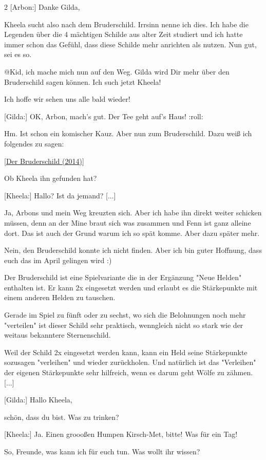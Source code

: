 \documentclass[10pt, a4paper, oneside]{book}
\begin{document}
\begin{multicols}{2}
[Arbon:] Danke Gilda,

Kheela sucht also nach dem Bruderschild. Irrsinn nenne ich dies. Ich habe die Legenden über die 4 mächtigen Schilde aus alter Zeit studiert und ich hatte immer schon das Gefühl, dass diese Schilde mehr anrichten als nutzen. Nun gut, sei es so.

@Kid, ich mache mich nun auf den Weg. Gilda wird Dir mehr über den Bruderschild sagen können. Ich such jetzt Kheela!

Ich hoffe wir sehen uns alle bald wieder!

[Gilda:] OK, Arbon, mach's gut. Der Tee geht auf's Haus! :roll:

Hm. Ist schon ein komischer Kauz. Aber nun zum Bruderschild. Dazu weiß ich folgendes zu sagen:

[\hyperref[storytext-2014-der-bruderschild]{Der Bruderschild (2014)}]

Ob Kheela ihn gefunden hat?

[Kheela:] Hallo? Ist da jemand? [...]

Ja, Arbons und mein Weg kreuzten sich. Aber ich habe ihn direkt weiter schicken müssen, denn an der Mine braut sich was zusammen und Fenn ist ganz alleine dort. Das ist auch der Grund warum ich so spät komme. Aber dazu später mehr.

Nein, den Bruderschild konnte ich nicht finden. Aber ich bin guter Hoffnung, dass euch das im April gelingen wird :)

Der Bruderschild ist eine Spielvariante die in der Ergänzung "Neue Helden" enthalten ist. Er kann 2x eingesetzt werden und erlaubt es die Stärkepunkte mit einem anderen Helden zu tauschen.

Gerade im Spiel zu fünft oder zu sechst, wo sich die Belohnungen noch mehr "verteilen" ist dieser Schild sehr praktisch, wenngleich nicht so stark wie der weitaus bekanntere Sternenschild.

Weil der Schild 2x eingesetzt werden kann, kann ein Held seine Stärkepunkte sozusagen "verleihen" und wieder zurückholen. Und natürlich ist das "Verleihen" der eigenen Stärkepunkte sehr hilfreich, wenn es darum geht Wölfe zu zähmen. [...]

[Gilda:] Hallo Kheela,

schön, dass du bist. Was zu trinken?

[Kheela:] Ja. Einen groooßen Humpen Kirsch-Met, bitte! Was für ein Tag!

So, Freunde, was kann ich für euch tun. Was wollt ihr wissen?


\end{multicols}
\end{document}
